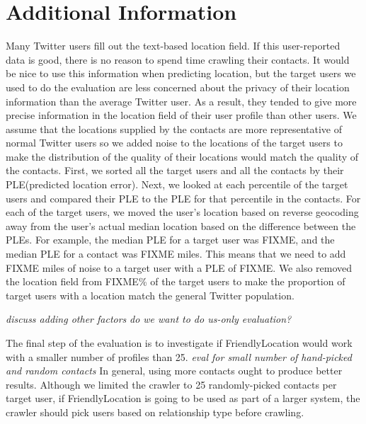 \section{Additional Information}
Many Twitter users fill out the text-based location field.
%
If this user-reported data is good, there is no reason to spend time
crawling their contacts.
%
It would be nice to use this information when predicting location, but
the target users we used to do the evaluation are less concerned about
the privacy of their location information than the average Twitter user.
%
As a result, they tended to give more precise information in the location
field of their user profile than other users.
%
We assume that the locations supplied by the contacts are more
representative of normal Twitter users so we added noise to the locations
of the target users to make the distribution of the quality of their
locations would match the quality of the contacts.
%
First, we sorted all the target users and all the contacts by their
PLE(predicted location error).
%
Next, we looked at each percentile of the target users and compared
their PLE to the PLE for that percentile in the contacts.
%
For each of the target users, we moved the user's location based on
reverse geocoding away from the user's actual median location based on the
difference between the PLEs.
%
For example, the median PLE for a target user was FIXME, and the median
PLE for a contact was FIXME miles.
%
This means that we need to add FIXME miles of noise to a target user
with a PLE of FIXME.
%
We also removed the location field from FIXME\% of the target users to
make the proportion of target users with a location match the general
Twitter population.

\emph{discuss adding other factors}
\emph{do we want to do us-only evaluation?}

The final step of the evaluation is to investigate if FriendlyLocation would
work with a smaller number of profiles than 25.
%
\emph{eval for small number of hand-picked and random contacts}
%
In general, using more contacts ought to produce better results.
%
Although we limited the crawler to 25 randomly-picked contacts per target
user, if FriendlyLocation is going to be used as part of a larger system, the
crawler should pick users based on relationship type before crawling.



